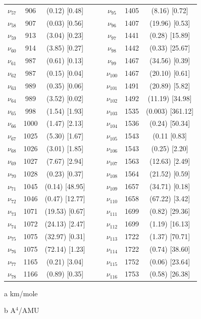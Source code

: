 \begin{table}[H]
\begin{center}
\begin{threeparttable}
\begin{tabular}{c c c c c c c c }
$\nu_{57}$&  906 & (0.12)  [0.48] &  &  & $\nu_{95}$&  1405 & (8.16)  [0.72] \\ 
$\nu_{58}$&  907 & (0.03)  [0.56] &  &  & $\nu_{96}$&  1407 & (19.96)  [0.53] \\ 
$\nu_{59}$&  913 & (3.04)  [0.23] &  &  & $\nu_{97}$&  1441 & (0.28)  [15.89] \\ 
$\nu_{60}$&  914 & (3.85)  [0.27] &  &  & $\nu_{98}$&  1442 & (0.33)  [25.67] \\ 
$\nu_{61}$&  987 & (0.61)  [0.13] &  &  & $\nu_{99}$&  1467 & (34.56)  [0.39] \\ 
$\nu_{62}$&  987 & (0.15)  [0.04] &  &  & $\nu_{100}$&  1467 & (20.10)  [0.61] \\ 
$\nu_{63}$&  989 & (0.35)  [0.06] &  &  & $\nu_{101}$&  1491 & (20.89)  [5.82] \\ 
$\nu_{64}$&  989 & (3.52)  [0.02] &  &  & $\nu_{102}$& 1492 & (11.19)  [34.98] \\ 
$\nu_{65}$&  998 & (1.54)  [1.93] &  &  & $\nu_{103}$&  1535 & (0.003)  [361.12] \\ 
$\nu_{66}$&  1000 & (1.47)  [2.13] &  &  & $\nu_{104}$&  1536 & (0.24)  [50.34] \\ 
$\nu_{67}$&  1025 & (5.30)  [1.67] &  &  & $\nu_{105}$&  1543 & (0.11  [0.83] \\ 
$\nu_{68}$&  1026 & (3.01)  [1.85] &  &  & $\nu_{106}$&  1543 & (0.25)  [2.20] \\ 
$\nu_{69}$&  1027 & (7.67)  [2.94] &  &  & $\nu_{107}$&  1563 & (12.63)  [2.49] \\ 
$\nu_{70}$&  1028 & (0.23)  [0.37] &  &  & $\nu_{108}$&  1564 & (21.52)  [0.59] \\ 
$\nu_{71}$&  1045 & (0.14)  [48.95] &  &  & $\nu_{109}$&  1657 & (34.71)  [0.18] \\ 
$\nu_{72}$&  1046 & (0.47)  [12.77] &  &  & $\nu_{110}$&  1658 & (67.22)  [3.42] \\ 
$\nu_{73}$&  1071 & (19.53)  [0.67] &  &  & $\nu_{111}$&  1699 & (0.82)  [29.36] \\ 
$\nu_{74}$&  1072 & (24.13)  [2.47] &  &  & $\nu_{112}$&  1699 & (1.19)  [16.13] \\ 
$\nu_{75}$&  1075 & (32.97)  [0.31] &  &  & $\nu_{113}$&  1722 & (1.37)  [70.71] \\ 
$\nu_{76}$&  1075 & (72.14)  [1.23] &  &  & $\nu_{114}$&  1722 & (0.74)  [38.60] \\ 
$\nu_{77}$&  1165 & (0.21)  [3.04] &  &  & $\nu_{115}$&  1752 & (0.06)  [23.64] \\ 
$\nu_{78}$&  1166 & (0.89)  [0.35] &  &  & $\nu_{116}$&  1753 & (0.58)  [26.38] \\ 
\bottomrule
\end{tabular}

\begin{tablenotes}
	\item[a] km/mole
	\item[b] A$^{4}$/AMU
\end{tablenotes}
\end{threeparttable}
\end{center}
\label{freqTribenzofDi}
\end{table}

